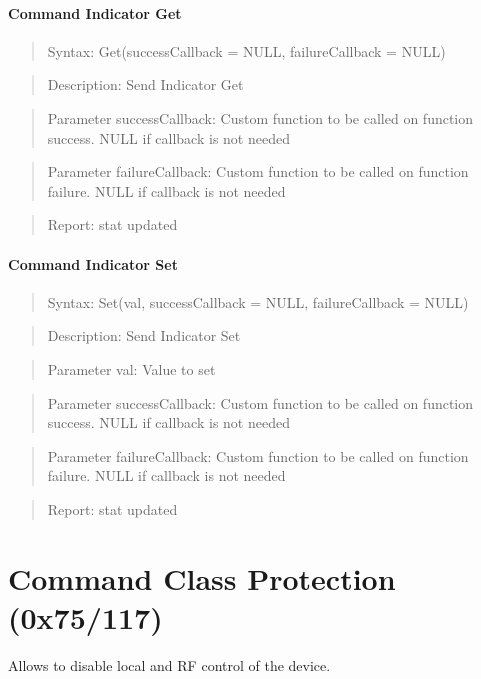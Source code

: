 \paragraph{Command Indicator Get}
\begin{quote}Syntax: Get(successCallback = NULL, failureCallback = NULL)\end{quote}
\begin{quote}Description: Send Indicator Get\end{quote}
\begin{quote}Parameter successCallback: Custom function to be called on function success. NULL if callback is not needed\end{quote}
\begin{quote}Parameter failureCallback: Custom function to be called on function failure. NULL if callback is not needed\end{quote}
\begin{quote}Report: stat updated\end{quote}

\paragraph{Command Indicator Set}
\begin{quote}Syntax: Set(val, successCallback = NULL, failureCallback = NULL)\end{quote}
\begin{quote}Description: Send Indicator Set\end{quote}
\begin{quote}Parameter val: Value to set\end{quote}
\begin{quote}Parameter successCallback: Custom function to be called on function success. NULL if callback is not needed\end{quote}
\begin{quote}Parameter failureCallback: Custom function to be called on function failure. NULL if callback is not needed\end{quote}
\begin{quote}Report: stat updated\end{quote}


\section{Command Class Protection (0x75/117)}

Allows to disable local and RF control of the device.
\newline

